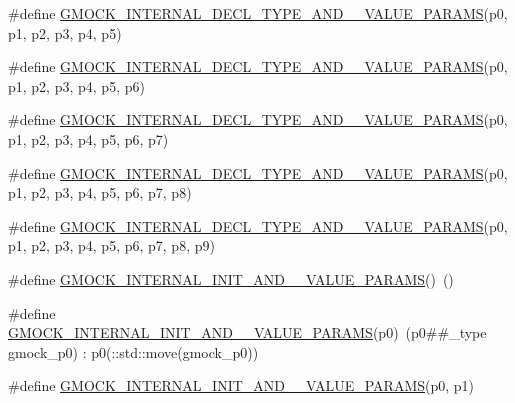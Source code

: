 \begin{DoxyCompactItemize}
\#define \mbox{\hyperlink{googletest-master_2googlemock_2include_2gmock_2gmock-generated-actions_8h_abffe20cc195c1f2a1682878bb7f7a35d}{G\+M\+O\+C\+K\+\_\+\+I\+N\+T\+E\+R\+N\+A\+L\+\_\+\+D\+E\+C\+L\+\_\+\+T\+Y\+P\+E\+\_\+\+A\+N\+D\+\_\+\_\+\+V\+A\+L\+U\+E\+\_\+\+P\+A\+R\+A\+MS}}(p0,  p1,  p2,  p3,  p4,  p5)
\item 
\#define \mbox{\hyperlink{googletest-master_2googlemock_2include_2gmock_2gmock-generated-actions_8h_acb3b2a137310a0ac944d3695a0911a64}{G\+M\+O\+C\+K\+\_\+\+I\+N\+T\+E\+R\+N\+A\+L\+\_\+\+D\+E\+C\+L\+\_\+\+T\+Y\+P\+E\+\_\+\+A\+N\+D\+\_\+\_\+\+V\+A\+L\+U\+E\+\_\+\+P\+A\+R\+A\+MS}}(p0,  p1,  p2,  p3,  p4,  p5,  p6)
\item 
\#define \mbox{\hyperlink{googletest-master_2googlemock_2include_2gmock_2gmock-generated-actions_8h_af6338728a5c12281280830ec7c5f685a}{G\+M\+O\+C\+K\+\_\+\+I\+N\+T\+E\+R\+N\+A\+L\+\_\+\+D\+E\+C\+L\+\_\+\+T\+Y\+P\+E\+\_\+\+A\+N\+D\+\_\+\_\+\+V\+A\+L\+U\+E\+\_\+\+P\+A\+R\+A\+MS}}(p0,  p1,  p2,  p3,  p4,  p5,  p6,  p7)
\item 
\#define \mbox{\hyperlink{googletest-master_2googlemock_2include_2gmock_2gmock-generated-actions_8h_a27e84307ea95be9e2e4526cd6b34a151}{G\+M\+O\+C\+K\+\_\+\+I\+N\+T\+E\+R\+N\+A\+L\+\_\+\+D\+E\+C\+L\+\_\+\+T\+Y\+P\+E\+\_\+\+A\+N\+D\+\_\+\_\+\+V\+A\+L\+U\+E\+\_\+\+P\+A\+R\+A\+MS}}(p0,  p1,  p2,  p3,  p4,  p5,  p6,  p7,  p8)
\item 
\#define \mbox{\hyperlink{googletest-master_2googlemock_2include_2gmock_2gmock-generated-actions_8h_a791e16a318652e43abb3c1aeba969d4d}{G\+M\+O\+C\+K\+\_\+\+I\+N\+T\+E\+R\+N\+A\+L\+\_\+\+D\+E\+C\+L\+\_\+\+T\+Y\+P\+E\+\_\+\+A\+N\+D\+\_\+\_\+\+V\+A\+L\+U\+E\+\_\+\+P\+A\+R\+A\+MS}}(p0,  p1,  p2,  p3,  p4,  p5,  p6,  p7,  p8,  p9)
\item 
\#define \mbox{\hyperlink{googletest-master_2googlemock_2include_2gmock_2gmock-generated-actions_8h_aea5ee581daf40874ee7777e3c2b6d4ff}{G\+M\+O\+C\+K\+\_\+\+I\+N\+T\+E\+R\+N\+A\+L\+\_\+\+I\+N\+I\+T\+\_\+\+A\+N\+D\+\_\+\_\+\+V\+A\+L\+U\+E\+\_\+\+P\+A\+R\+A\+MS}}()~()
\item 
\#define \mbox{\hyperlink{googletest-master_2googlemock_2include_2gmock_2gmock-generated-actions_8h_ad9d6ae16782bf5b8ffa096356f20b5ef}{G\+M\+O\+C\+K\+\_\+\+I\+N\+T\+E\+R\+N\+A\+L\+\_\+\+I\+N\+I\+T\+\_\+\+A\+N\+D\+\_\+\_\+\+V\+A\+L\+U\+E\+\_\+\+P\+A\+R\+A\+MS}}(p0)~(p0\#\#\+\_\+type gmock\+\_\+p0) \+: p0(\+::std\+::move(gmock\+\_\+p0))
\item 
\#define \mbox{\hyperlink{googletest-master_2googlemock_2include_2gmock_2gmock-generated-actions_8h_af8fc781d28282b09de4b5bda9563cded}{G\+M\+O\+C\+K\+\_\+\+I\+N\+T\+E\+R\+N\+A\+L\+\_\+\+I\+N\+I\+T\+\_\+\+A\+N\+D\+\_\+\_\+\+V\+A\+L\+U\+E\+\_\+\+P\+A\+R\+A\+MS}}(p0,  p1)

\end{DoxyCompactItemize}
